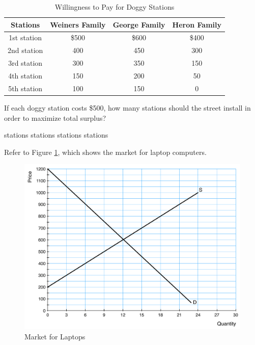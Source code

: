 \documentclass[addpoints,11pt]{exam}
\theoremstyle{definition}
\begin{document}
\begin{questions}
\begin{table}[ht]
	\caption{Willingness to Pay for Doggy Stations}
	\centering
	\begin{tabular}{  c| ccc} 
		
		Stations & Weiners Family & George Family & Heron Family\\
		\hline
		1st station & \$500 & \$600 & \$400\\
		2nd station & 400 & 450 & 300\\
		3rd station & 300 & 350 & 150\\
		4th station & 150 & 200 & 50\\
		5th station & 100 & 150 & 0\\
	\end{tabular}
	\label{MC15}
\end{table}

\newpage

If each doggy station costs \$500, how many stations should the street install in order to maximize total surplus?
	
	\begin{choices}
			 stations
			 stations
			 stations
			 stations
	\end{choices}
	
		
\question Refer to Figure \ref{MC16}, which shows the market for laptop computers.

\begin{figure}[H]
	\centering
	\includegraphics[scale=.40]{Exam1_MC16.pdf}
	\caption{Market for Laptops}
	\label{MC16}
\end{figure}


\end{questions}
\end{document}
